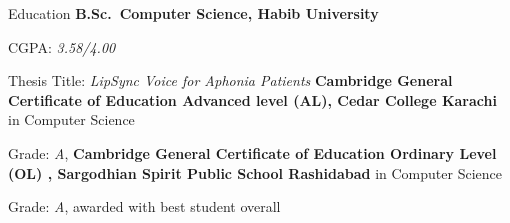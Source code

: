 \begin{rubric}{Education}
\entry*[2020 -- Present]%
	\textbf{B.Sc.~Computer Science, Habib University}\par
        CGPA: \emph{3.58/4.00} \par
        Thesis Title: \emph{LipSync Voice for Aphonia Patients }
\entry*[2018-2020]%
	\textbf{Cambridge General Certificate of Education Advanced level (AL), Cedar College Karachi} in Computer Science
	\par Grade: \emph{A},
\entry*[2015 -- 2018]%
	\textbf{Cambridge General Certificate of Education Ordinary Level (OL) , Sargodhian Spirit Public School Rashidabad} in Computer Science
	\par Grade: \emph{A}, awarded with best student overall

% 
\end{rubric}